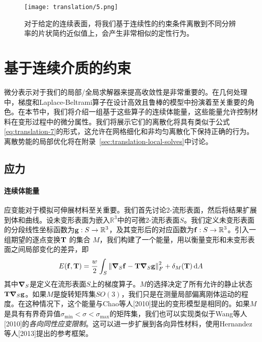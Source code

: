 \begin{translation}
\begin{figure}
  \centering
  \texttt{[image: translation/5.png]}
  \caption{
    对于给定的连续表面，将我们基于连续性的约束条件离散到不同分辨率的片状简约近似值上，会产生非常相似的定性行为。
  }
  \label{fig:translation-5}
\end{figure}

\section{基于连续介质的约束}
\label{sec:translation-continuum-based-constraints}

微分表示对于我们的局部/全局求解器来提高收敛性是非常重要的。在几何处理中，梯度和Laplace-Beltrami算子在设计高效且鲁棒的模型中扮演着至关重要的角色。在本节中，我们将介绍一组基于这些算子的连续体能量，这些能量允许控制材料在变形过程中的微分属性。我们将展示它们的离散化将具有类似于公式\eqref{eq:translation-7}的形式，这允许在网格细化和非均匀离散化下保持正确的行为。离散势能的局部优化将在附录~\ref{sec:translation-local-solves}中讨论。

\subsection{应力}

\paragraph{连续体能量}

应变能对于模拟可伸展材料至关重要。我们首先讨论2-流形表面，然后将结果扩展到体和曲线。设未变形表面为嵌入$\mathbb{R}^3$中的可微2-流形表面$S$。我们定义未变形表面的分段线性坐标函数为$\vb{g} : S \to \mathbb{R}^3$，及其变形后的对应函数为$\vb{f} : S \to \mathbb{R}^3$。引入一组期望的逐点变换$\vb{T}$ 的集合 $M$，我们构建了一个能量，用以衡量变形和未变形表面之间局部变化的差异，即
\begin{equation}
  E(\vb{f}, \vb{T}) = \frac{w}{2} \int_S \norm{\grad_S{\vb{f}} - \vb{T} \grad_S{\vb{g}}}_F^2 + \delta_M(\vb{T}) \dd{A}
  \label{eq:translation-15}
\end{equation}
其中$\grad_S$是定义在流形表面$S$上的梯度算子。$M$的选择决定了所有允许的静止状态$\vb{T} \grad_S{\vb{g}}$。如果$M$是旋转矩阵集$SO(3)$，我们只是在测量局部偏离刚体运动的程度。在这种情况下，这个能量与Chao等人[2010]提出的变形模型是相同的。如果$M$是具有有界奇异值$\sigma_{\min} < \sigma < \sigma_{\max}$的矩阵集，我们也可以实现类似于Wang等人[2010]的\emph{各向同性应变限制}。这可以进一步扩展到各向异性材料，使用Hernandez等人[2013]提出的参考框架。


\end{translation}
